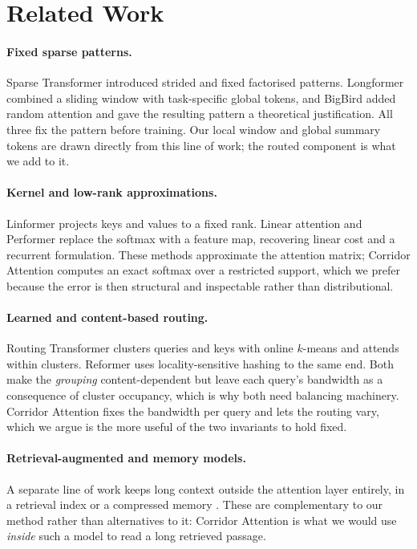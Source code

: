 \section{Related Work}\label{sec:related}

\paragraph{Fixed sparse patterns.} Sparse Transformer
\citep{child2019sparse} introduced strided and fixed factorised patterns.
Longformer \citep{beltagy2020longformer} combined a sliding window with
task-specific global tokens, and BigBird \citep{zaheer2020bigbird} added
random attention and gave the resulting pattern a theoretical justification.
All three fix the pattern before training. Our local window and global summary
tokens are drawn directly from this line of work; the routed component is what
we add to it.

\paragraph{Kernel and low-rank approximations.} Linformer
\citep{wang2020linformer} projects keys and values to a fixed rank. Linear
attention \citep{katharopoulos2020linear} and Performer
\citep{choromanski2021performer} replace the softmax with a feature map,
recovering linear cost and a recurrent formulation. These methods approximate
the attention matrix; Corridor Attention computes an exact softmax over a
restricted support, which we prefer because the error is then structural and
inspectable rather than distributional.

\paragraph{Learned and content-based routing.} Routing Transformer
\citep{roy2021efficient} clusters queries and keys with online $k$-means and
attends within clusters. Reformer \citep{kitaev2020reformer} uses
locality-sensitive hashing to the same end. Both make the \emph{grouping}
content-dependent but leave each query's bandwidth as a consequence of cluster
occupancy, which is why both need balancing machinery. Corridor Attention fixes
the bandwidth per query and lets the routing vary, which we argue is the more
useful of the two invariants to hold fixed.

\paragraph{Retrieval-augmented and memory models.} A separate line of work
keeps long context outside the attention layer entirely, in a retrieval index
or a compressed memory \citep{rae2020compressive,borgeaud2022improving}. These
are complementary to our method rather than alternatives to it: Corridor
Attention is what we would use \emph{inside} such a model to read a long
retrieved passage.

